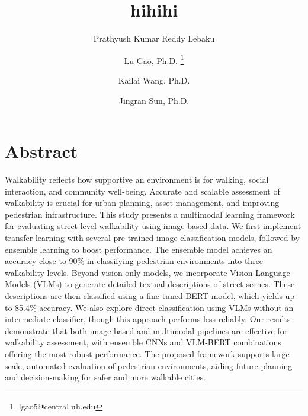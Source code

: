 \documentclass[11pt]{article}
\begin{document}

\title{hihihi}

\author[1]{\normalsize Prathyush Kumar Reddy Lebaku}
\author[1]{Lu Gao, Ph.D. \thanks{lgao5@central.uh.edu}}
\author[2]{Kailai Wang, Ph.D.}
\author[3]{Jingran Sun, Ph.D.}



\date{}

\maketitle       

\linenumbers 


\newpage
\section*{Abstract}
Walkability reflects how supportive an environment is for walking, social interaction, and community well-being. Accurate and scalable assessment of walkability is crucial for urban planning, asset management, and improving pedestrian infrastructure. This study presents a multimodal learning framework for evaluating street-level walkability using image-based data. We first implement transfer learning with several pre-trained image classification models, followed by ensemble learning to boost performance. The ensemble model achieves an accuracy close to 90\% in classifying pedestrian environments into three walkability levels. Beyond vision-only models, we incorporate Vision-Language Models (VLMs) to generate detailed textual descriptions of street scenes. These descriptions are then classified using a fine-tuned BERT model, which yields up to 85.4\% accuracy. We also explore direct classification using VLMs without an intermediate classifier, though this approach performs less reliably. Our results demonstrate that both image-based and multimodal pipelines are effective for walkability assessment, with ensemble CNNs and VLM-BERT combinations offering the most robust performance. The proposed framework supports large-scale, automated evaluation of pedestrian environments, aiding future planning and decision-making for safer and more walkable cities.
\end{document}
